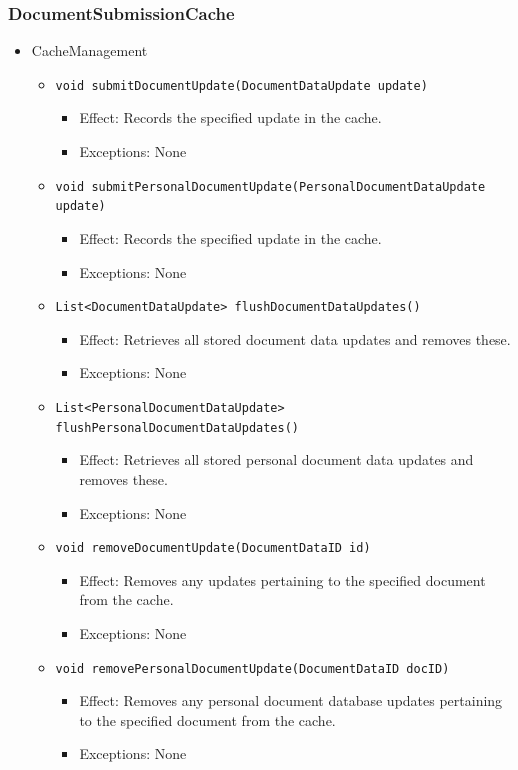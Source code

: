 \documentclass[a4paper,10pt]{article}
\begin{document}
\subsubsection*{DocumentSubmissionCache}
\begin{itemize}
	\item CacheManagement
	\begin{itemize}
		\item \texttt{void submitDocumentUpdate(DocumentDataUpdate update)}
		\begin{itemize}
			\item Effect: Records the specified update in the cache.
			\item Exceptions: None
		\end{itemize}

		\item \texttt{void submitPersonalDocumentUpdate(PersonalDocumentDataUpdate update)}
		\begin{itemize}
			\item Effect: Records the specified update in the cache.
			\item Exceptions: None
		\end{itemize}

		\item \texttt{List<DocumentDataUpdate> flushDocumentDataUpdates()}
		\begin{itemize}
			\item Effect: Retrieves all stored document data updates and removes these.
			\item Exceptions: None
		\end{itemize}

		\item \texttt{List<PersonalDocumentDataUpdate> flushPersonalDocumentDataUpdates()}
		\begin{itemize}
			\item Effect: Retrieves all stored personal document data updates and removes these.
			\item Exceptions: None
		\end{itemize}

		\item \texttt{void removeDocumentUpdate(DocumentDataID id)}
		\begin{itemize}
			\item Effect: Removes any updates pertaining to the specified document from the cache.
			\item Exceptions: None
		\end{itemize}

		\item \texttt{void removePersonalDocumentUpdate(DocumentDataID docID)}
		\begin{itemize}
			\item Effect: Removes any personal document database updates pertaining to the specified document from the cache.
			\item Exceptions: None
		\end{itemize}
	\end{itemize}
\end{itemize}
\end{document}
